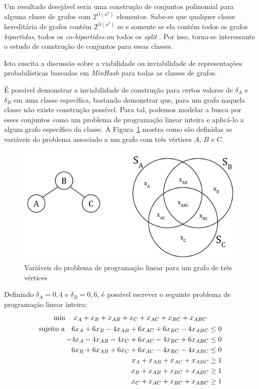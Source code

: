 Um resultado desejável seria uma construção de conjuntos polinomial para alguma classe de grafos com $2^{O(n^2)}$ elementos. Sabe-se que qualquer classe hereditária de grafos contém $2^{O(n^2)}$ se e somente se ela contém todos os grafos \emph{bipartidos}, todos os \emph{co-bipartidos} ou todos os \emph{split} \cite{spinrad2003efficient}. Por isso, torna-se interessante o estudo de construção de conjuntos para essas classes.

Isto suscita a discussão sobre a viabilidade ou inviabilidade de representações probabilísticas baseadas em \emph{MinHash} para todas as classes de grafos.

É possível demonstrar a inviabilidade de construção para certos valores de $\delta_A$ e $\delta_B$ em uma classe específica, bastando demonstrar que, para um grafo naquela classe não existe construção possível. Para tal, podemos modelar a busca por esses conjuntos como um problema de programação linear inteira e aplicá-lo a algum grafo específico da classe. A Figura~\ref{fig:graphs_mhprove} mostra como são definidas as variáveis do problema associado a um grafo com três vértices $A$, $B$ e $C$.

\begin{figure}[!htbp]
  \centering
  \includegraphics[scale=0.5]{figures/graphs_mhprove.pdf}
  \caption{Variáveis do problema de programação linear para um grafo de três vértices}
  \label{fig:graphs_mhprove}
\end{figure}

Definindo $\delta_A = 0,4$  e $\delta_B = 0,6$, é possível escrever o seguinte problema de programação linear inteira:
\begin{gather*}
\min \quad x_{A} + x_{B} + x_{AB} + x_{C} + x_{AC} + x_{BC} + x_{ABC} \\
\begin{aligned}
\textup{sujeito a} \quad 
6x_{A} + 6x_{B} - 4x_{AB} + 6x_{AC} + 6x_{BC} - 4x_{ABC} \leq 0 \\
-4x_{A} - 4x_{AB} - 4x_{C} + 6x_{AC} - 4x_{BC} + 6x_{ABC} \leq 0 \\
6x_{B} + 6x_{AB} + 6x_{C} + 6x_{AC} - 4x_{BC} - 4x_{ABC} \leq 0 \\
x_{A} + x_{AB} + x_{AC} + x_{ABC} \geq 1 \\
x_{B} + x_{AB} + x_{BC} + x_{ABC} \geq 1 \\
x_{C} + x_{AC} + x_{BC} + x_{ABC} \geq 1 \\
\end{aligned}
\end{gather*}

